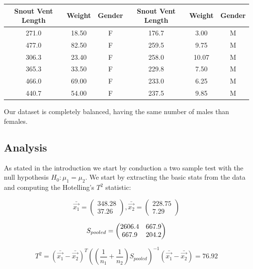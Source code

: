 \documentclass[11pt,a4paper]{article}
\begin{document}
	\begin{table}[H] \centering
		\begin{tabular}{|ccc|ccc|}
			\hline
			Snout Vent Length & Weight & Gender & Snout Vent Length & Weight & Gender \\ \hline
			271.0             & 18.50  & F      & 176.7             & 3.00   & M      \\
			477.0             & 82.50  & F      & 259.5             & 9.75   & M      \\
			306.3             & 23.40  & F      & 258.0             & 10.07  & M      \\
			365.3             & 33.50  & F      & 229.8             & 7.50   & M      \\
			466.0             & 69.00  & F      & 233.0             & 6.25   & M      \\
			440.7             & 54.00  & F      & 237.5             & 9.85   & M      \\ \hline
		\end{tabular}
	\end{table}
	
	Our dataset is completely balanced, having the same number of males than females.
	
	\subsection{Analysis}
	
	As stated in the introduction we start by conduction a two sample test with the null hypothesis $H_0: \mu_1 = \mu_2$. We start by extracting the basic stats from the data and computing the Hotelling's $T^2$ statistic:
	
	$$ \bar{\vec{x_1}} = 
	\begin{pmatrix}
	348.28  \\         
	37.26
	\end{pmatrix} 
	, \bar{\vec{x_2}} = 
	\begin{pmatrix}
	228.75  \\         
	7.29
	\end{pmatrix} 
	$$
	
	$$ S_{pooled} = 
	\begin{pmatrix}
		\multicolumn{1}{c}{2606.4} & \multicolumn{1}{c}{667.9} \\
		667.9                      & 204.2                    
	\end{pmatrix} 
	$$ 
	
	$$ T^2 = (\bar{\vec{x_1}} - \bar{\vec{x_2}})^T ((\frac{1}{n_1} + \frac{1}{n_2}) S_{pooled})^{-1} (\bar{\vec{x_1}} - \bar{\vec{x_2}}) = 76.92 $$ 
	
\end{document}
